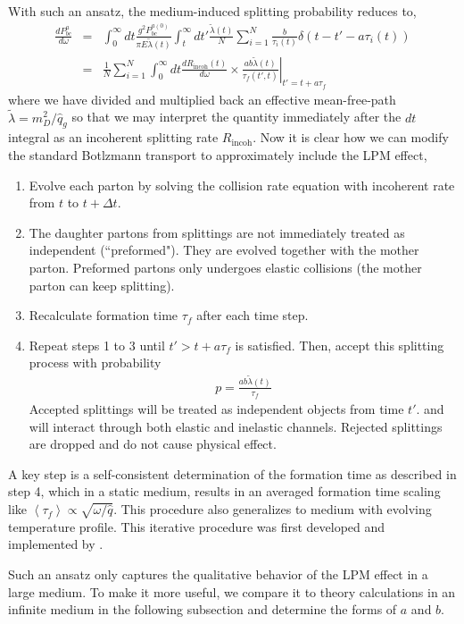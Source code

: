 \documentclass[aps, prc, reprint, amsmath, groupedaddress, nofootinbib]{revtex4-1}
\begin{document}
With such an ansatz, the medium-induced splitting probability reduces to,
\begin{eqnarray}
\nonumber
\frac{dP^{a}_{bc}}{d\omega} &=& \int_0^\infty dt \frac{g^2 P_{bc}^{a(0)}}{\pi E\tilde{\lambda}(t)} \int_t^\infty dt' \frac{\tilde{\lambda}(t)}{N}\sum_{i=1}^N \frac{b}{\tau_i(t)} \delta(t-t'- a \tau_i(t)) \\
&=& \frac{1}{N}\sum_{i=1}^N\int_0^\infty dt \frac{dR_{\textrm{incoh}}(t)}{d\omega} \times \left.\frac{ab\tilde{\lambda}(t)}{\tau_f(t',t)}\right|_{t'=t+a\tau_f}
\end{eqnarray}
where we have divided and multiplied back an effective mean-free-path $\tilde{\lambda} = m_D^2/\hat{q}_g$ so that we may interpret the quantity immediately after the $dt$ integral as an incoherent splitting rate $R_{\textrm{incoh}}$.
Now it is clear how we can modify the standard Botlzmann transport to approximately include the LPM effect,
\begin{enumerate}
\item Evolve each parton by solving the collision rate equation with incoherent rate from $t$ to $t+\Delta t$.
\item The daughter partons from splittings are not immediately treated as independent (``preformed"). They are evolved together with the mother parton. Preformed partons only undergoes elastic collisions (the mother parton can keep splitting).
\item Recalculate formation time $\tau_f$ after each time step.
\item Repeat steps 1 to 3 until $t' > t + a\tau_f$ is satisfied. 
Then, accept this splitting process with probability 
\begin{eqnarray}
p = \frac{ab\tilde{\lambda}(t)}{\tau_f}
\label{eq:rejection}
\end{eqnarray}
Accepted splittings will be treated as independent objects from time $t'$. and will interact through both elastic and inelastic channels.
Rejected splittings are dropped and do not cause physical effect.
\end{enumerate} 
A key step is a self-consistent determination of the formation time as described in step 4, which in a static medium, results in an averaged formation time scaling like $\left\langle\tau_f\right\rangle \propto \sqrt{\omega/\hat{q}}$.
This procedure also generalizes to medium with evolving temperature profile.
This iterative procedure was first developed and implemented by \cite{Zapp:2011ya}.

Such an ansatz only captures the qualitative behavior of the LPM effect in a large medium. 
To make it more useful, we compare it to theory calculations in an infinite medium in the following subsection and determine the forms of $a$ and $b$.
\end{document}
